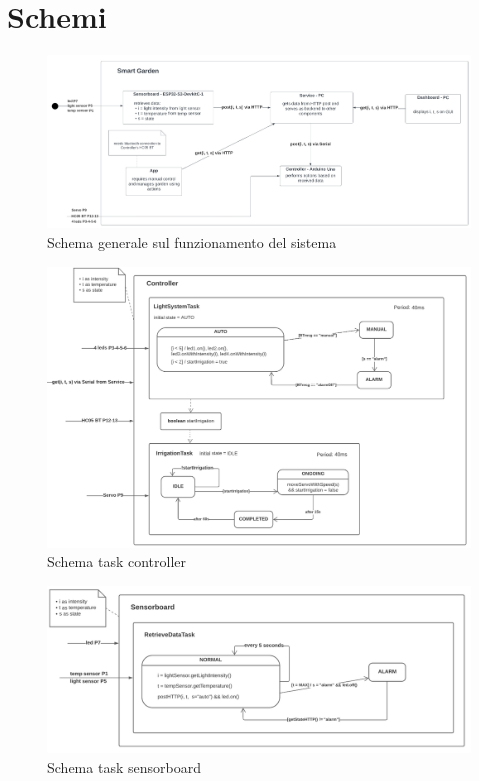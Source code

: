 \documentclass[a4paper, 12pt]{article}
\begin{document}
\section{Schemi}
\begin{figure}[ht]
    \includegraphics[scale=0.5]{general_smart_garden}
    \caption{Schema generale sul funzionamento del sistema}
\end{figure}

\begin{figure}[ht]
    \includegraphics[scale=0.65]{controller_detail_smart_garden}
    \caption{Schema task controller}
\end{figure}

\begin{figure}[ht]
    \includegraphics[scale=0.49]{sensorboard_detail_smart_garden}
    \caption{Schema task sensorboard}
\end{figure}
\end{document}
